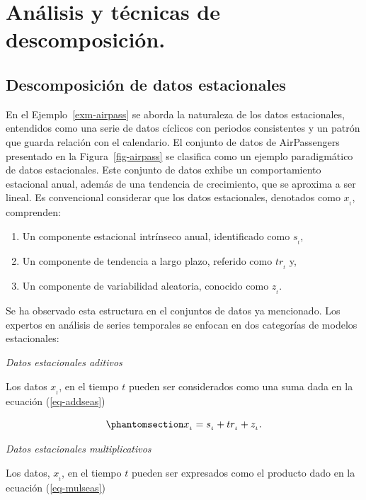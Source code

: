\documentclass[
  us-letterpaper,
]{scrreprt}
\theoremstyle{plain}
\theoremstyle{definition}
\theoremstyle{definition}
\theoremstyle{plain}
\theoremstyle{remark}
\begin{document}
\section{Análisis y técnicas de
descomposición.}\label{anuxe1lisis-y-tuxe9cnicas-de-descomposiciuxf3n.}

\subsection{Descomposición de datos
estacionales}\label{descomposiciuxf3n-de-datos-estacionales}

En el Ejemplo~\ref{exm-airpass} se aborda la naturaleza de los datos
estacionales, entendidos como una serie de datos cíclicos con periodos
consistentes y un patrón que guarda relación con el calendario. El
conjunto de datos de AirPassengers presentado en la
Figura~\ref{fig-airpass} se clasifica como un ejemplo paradigmático de
datos estacionales. Este conjunto de datos exhibe un comportamiento
estacional anual, además de una tendencia de crecimiento, que se
aproxima a ser lineal. Es convencional considerar que los datos
estacionales, denotados como \(x_{_t}\), comprenden:

\begin{enumerate}
\def\labelenumi{\alph{enumi}.}
\item
  Un componente estacional intrínseco anual, identificado como
  \(s_{_t}\),
\item
  Un componente de tendencia a largo plazo, referido como \(tr_{_t}\) y,
\item
  Un componente de variabilidad aleatoria, conocido como \(z_{_t}\).
\end{enumerate}

Se ha observado esta estructura en el conjuntos de datos ya mencionado.
Los expertos en análisis de series temporales se enfocan en dos
categorías de modelos estacionales:

\emph{Datos estacionales aditivos}

Los datos \(x_{_t}\), en el tiempo \(t\) pueden ser considerados como
una suma dada en la ecuación (\ref{eq-addseas})

\begin{equation}\phantomsection\label{eq-addseas}{
x_{_t}=s_{_t}+tr_{_t}+z_{_t}.
}\end{equation}

\emph{Datos estacionales multiplicativos}

Los datos, \(x_{_t}\), en el tiempo \(t\) pueden ser expresados como el
producto dado en la ecuación (\ref{eq-mulseas})
\end{document}
